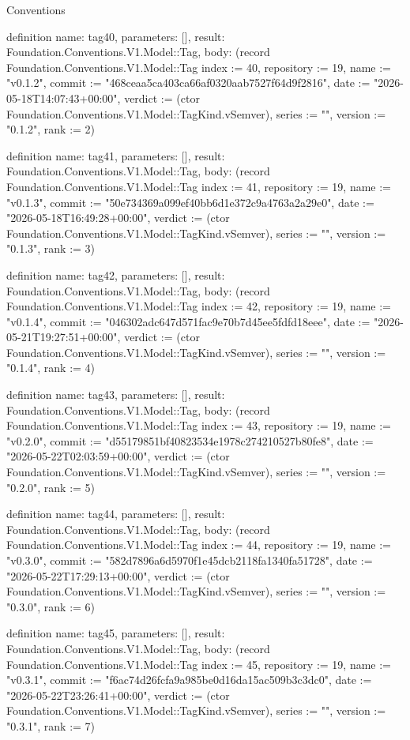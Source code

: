 \begin{lexlean}{Conventions}
\begin{semanticmodule}
definition{
  name: tag40,
  parameters: [],
  result: Foundation.Conventions.V1.Model::Tag,
  body: (record Foundation.Conventions.V1.Model::Tag {index := 40, repository := 19, name := "v0.1.2", commit := "468ceaa5ca403ca66af0320aab7527f64d9f2816", date := "2026-05-18T14:07:43+00:00", verdict := (ctor Foundation.Conventions.V1.Model::TagKind.vSemver), series := "", version := "0.1.2", rank := 2})
}

definition{
  name: tag41,
  parameters: [],
  result: Foundation.Conventions.V1.Model::Tag,
  body: (record Foundation.Conventions.V1.Model::Tag {index := 41, repository := 19, name := "v0.1.3", commit := "50e734369a099ef40bb6d1e372c9a4763a2a29e0", date := "2026-05-18T16:49:28+00:00", verdict := (ctor Foundation.Conventions.V1.Model::TagKind.vSemver), series := "", version := "0.1.3", rank := 3})
}

definition{
  name: tag42,
  parameters: [],
  result: Foundation.Conventions.V1.Model::Tag,
  body: (record Foundation.Conventions.V1.Model::Tag {index := 42, repository := 19, name := "v0.1.4", commit := "046302adc647d571fac9e70b7d45ee5fdfd18eee", date := "2026-05-21T19:27:51+00:00", verdict := (ctor Foundation.Conventions.V1.Model::TagKind.vSemver), series := "", version := "0.1.4", rank := 4})
}

definition{
  name: tag43,
  parameters: [],
  result: Foundation.Conventions.V1.Model::Tag,
  body: (record Foundation.Conventions.V1.Model::Tag {index := 43, repository := 19, name := "v0.2.0", commit := "d55179851bf40823534e1978c274210527b80fe8", date := "2026-05-22T02:03:59+00:00", verdict := (ctor Foundation.Conventions.V1.Model::TagKind.vSemver), series := "", version := "0.2.0", rank := 5})
}

definition{
  name: tag44,
  parameters: [],
  result: Foundation.Conventions.V1.Model::Tag,
  body: (record Foundation.Conventions.V1.Model::Tag {index := 44, repository := 19, name := "v0.3.0", commit := "582d7896a6d5970f1e45dcb2118fa1340fa51728", date := "2026-05-22T17:29:13+00:00", verdict := (ctor Foundation.Conventions.V1.Model::TagKind.vSemver), series := "", version := "0.3.0", rank := 6})
}

definition{
  name: tag45,
  parameters: [],
  result: Foundation.Conventions.V1.Model::Tag,
  body: (record Foundation.Conventions.V1.Model::Tag {index := 45, repository := 19, name := "v0.3.1", commit := "f6ac74d26fcfa9a985be0d16da15ac509b3c3dc0", date := "2026-05-22T23:26:41+00:00", verdict := (ctor Foundation.Conventions.V1.Model::TagKind.vSemver), series := "", version := "0.3.1", rank := 7})
}


\end{semanticmodule}
\end{lexlean}
